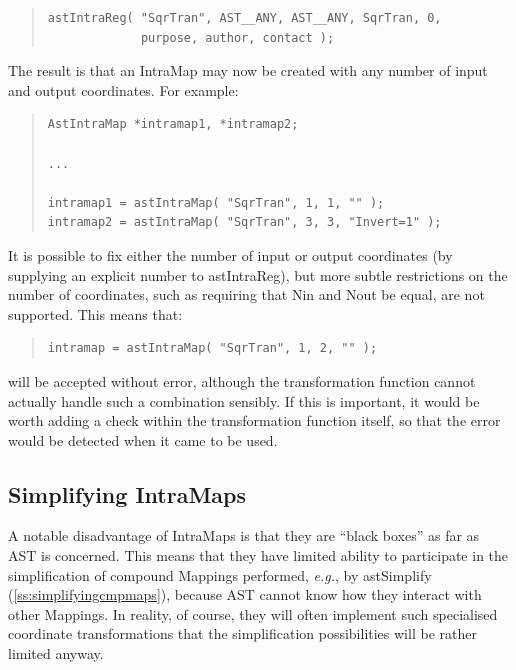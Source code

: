 \documentclass[twoside,11pt]{article}
\newcommand{\htmlref}[2]{#1}
\newcommand{\xlabel}[1]{}
\newcommand{\secref}[1]{\S\ref{#1}}
\renewcommand{\secref}[1]{\ref{#1}}
\begin{document}
\begin{quote}
\small
\begin{verbatim}
astIntraReg( "SqrTran", AST__ANY, AST__ANY, SqrTran, 0,
             purpose, author, contact );
\end{verbatim}
\normalsize
\end{quote}

The result is that an \htmlref{IntraMap}{IntraMap} may now be created with any number of
input and output coordinates. For example:

\begin{quote}
\small
\begin{verbatim}
AstIntraMap *intramap1, *intramap2;

...

intramap1 = astIntraMap( "SqrTran", 1, 1, "" );
intramap2 = astIntraMap( "SqrTran", 3, 3, "Invert=1" );
\end{verbatim}
\normalsize
\end{quote}

It is possible to fix either the number of input or output coordinates
(by supplying an explicit number to \htmlref{astIntraReg}{astIntraReg}), but more subtle
restrictions on the number of coordinates, such as requiring that \htmlref{Nin}{Nin}
and \htmlref{Nout}{Nout} be equal, are not supported. This means that:

\begin{quote}
\small
\begin{verbatim}
intramap = astIntraMap( "SqrTran", 1, 2, "" );
\end{verbatim}
\normalsize
\end{quote}

will be accepted without error, although the transformation function
cannot actually handle such a combination sensibly. If this is
important, it would be worth adding a check within the transformation
function itself, so that the error would be detected when it came to
be used.

\subsection{\xlabel{MaxTran}\label{ss:simplifyingintramaps}Simplifying IntraMaps}

A notable disadvantage of IntraMaps is that they are ``black boxes''
as far as AST is concerned. This means that they have limited ability
to participate in the simplification of compound Mappings performed,
{\em{e.g.}}, by \htmlref{astSimplify}{astSimplify} (\secref{ss:simplifyingcmpmaps}), because
AST cannot know how they interact with other Mappings. In reality, of
course, they will often implement such specialised coordinate
transformations that the simplification possibilities will be rather
limited anyway.
\end{document}
